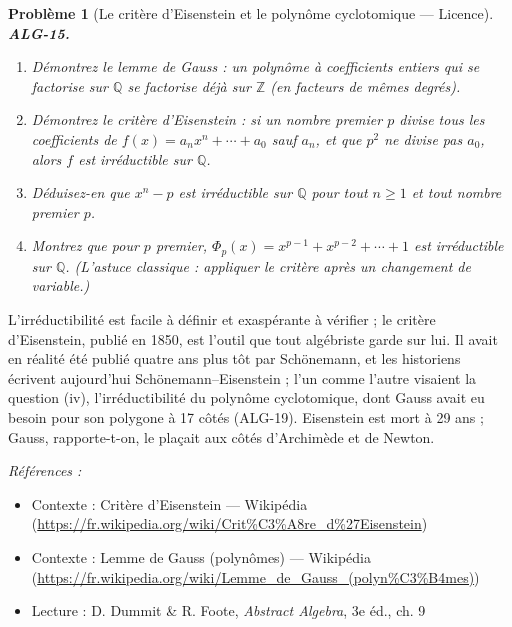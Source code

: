 \documentclass[11pt]{article}
\newtheorem{problem}{Problème}
\newenvironment{refs}{\par\small\noindent\emph{Références :}\begin{itemize}\setlength\itemsep{0pt}}{\end{itemize}\normalsize}
\begin{document}
\begin{problem}[{Le critère d'Eisenstein et le polynôme cyclotomique --- Licence}]
\textbf{ALG-15.} \begin{enumerate}
\item[(i)] Démontrez le lemme de Gauss : un polynôme à coefficients
entiers qui se factorise sur $\mathbb{Q}$ se factorise déjà sur $\mathbb{Z}$ (en facteurs
de mêmes degrés).
\item[(ii)] Démontrez le critère d'Eisenstein : si un nombre premier $p$ divise tous les
coefficients de $f(x) = a_n x^n + \cdots + a_0$ sauf $a_n$, et que $p^2$ ne divise pas
$a_0$, alors $f$ est irréductible sur $\mathbb{Q}$.
\item[(iii)] Déduisez-en que $x^n - p$ est
irréductible sur $\mathbb{Q}$ pour tout $n \ge 1$ et tout nombre premier $p$.
\item[(iv)] Montrez que pour
$p$ premier, $\Phi_p(x) = x^{p-1} + x^{p-2} + \cdots + 1$ est irréductible sur $\mathbb{Q}$.
(L'astuce classique : appliquer le critère après un changement de variable.)
\end{enumerate}

\end{problem}

\noindent L'irréductibilité est facile à définir et exaspérante à vérifier ; le critère d'Eisenstein,
publié en 1850, est l'outil que tout algébriste garde sur lui. Il avait en réalité été publié quatre ans plus
tôt par Schönemann, et les historiens écrivent aujourd'hui \og{} Schönemann--Eisenstein \fg{} ; l'un comme l'autre
visaient la question (iv), l'irréductibilité du polynôme cyclotomique, dont Gauss avait eu besoin pour son
polygone à 17 côtés (ALG-19). Eisenstein est mort à 29 ans ; Gauss, rapporte-t-on, le plaçait aux côtés
d'Archimède et de Newton.

\begin{refs}
\item Contexte : Critère d'Eisenstein --- Wikipédia (\url{https://fr.wikipedia.org/wiki/Crit%C3%A8re_d%27Eisenstein})
\item Contexte : Lemme de Gauss (polynômes) --- Wikipédia (\url{https://fr.wikipedia.org/wiki/Lemme_de_Gauss_(polyn%C3%B4mes)})
\item Lecture : D. Dummit \& R. Foote, \textit{Abstract Algebra}, 3e éd., ch. 9
\end{refs}

\bigskip
\end{document}
